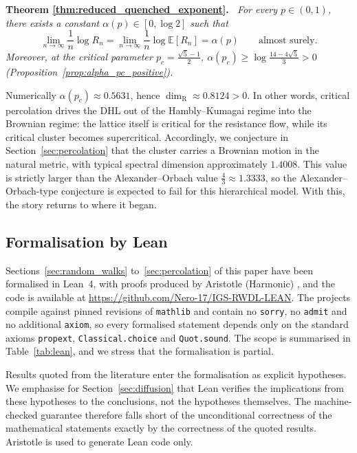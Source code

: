 \documentclass{article}
\newenvironment{restated}[1]{%
  \par\noindent\textbf{Theorem #1.}\itshape\ }%
  {\par}
\theoremstyle{plain}
\theoremstyle{definition}
\newcommand{\dimresis}{\dim_\mathrm{R}}
\begin{document}
\begin{restated}{\ref{thm:reduced_quenched_exponent}}
For every $p\in(0,1)$, there exists a constant $\alpha(p)\in[0,\log 2]$ such that
\[
\lim_{n\to\infty}\frac1n\log R_n=\lim_{n\to\infty}\frac1n\log\mathbb E[R_n]=\alpha(p)
\qquad\text{almost surely}.
\]
Moreover, at the critical parameter $p_c=\frac{\sqrt5-1}{2}$, $\alpha(p_c)\ge\log\frac{14-4\sqrt5}{3}>0$ (Proposition~\ref{prop:alpha_pc_positive}).
\end{restated}

Numerically $\alpha(p_c)\approx 0.5631$, hence $\dimresis\approx 0.8124>0$.
In other words, critical percolation drives the DHL out of the Hambly--Kumagai regime into the Brownian regime: the lattice itself is critical for the resistance flow, while its critical cluster becomes supercritical.
Accordingly, we conjecture in Section~\ref{sec:percolation} that the cluster carries a Brownian motion in the natural metric, with typical spectral dimension approximately $1.4008$.
This value is strictly larger than the Alexander--Orbach value $\frac43\approx 1.3333$, so the Alexander--Orbach-type conjecture is expected to fail for this hierarchical model.
With this, the story returns to where it began.














\subsection{Formalisation by Lean}\label{subsec:formalisation}
Sections~\ref{sec:random_walks} to~\ref{sec:percolation} of this paper have been formalised in Lean~4, with proofs produced by Aristotle (Harmonic) \cite{achim2025aristotle}, and the code is available at \url{https://github.com/Nero-17/IGS-RWDL-LEAN}.
The projects compile against pinned revisions of \texttt{mathlib} and contain no \texttt{sorry}, no \texttt{admit} and no additional \texttt{axiom}, so every formalised statement depends only on the standard axioms \texttt{propext}, \texttt{Classical.choice} and \texttt{Quot.sound}.
The scope is summarised in Table~\ref{tab:lean}, and we stress that the formalisation is partial.

Results quoted from the literature enter the formalisation as explicit hypotheses.
We emphasise for Section~\ref{sec:diffusion} that Lean verifies the implications from these hypotheses to the conclusions, not the hypotheses themselves.
The machine-checked guarantee therefore falls short of the unconditional correctness of the mathematical statements exactly by the correctness of the quoted results.
Aristotle is used to generate Lean code only.
\end{document}
